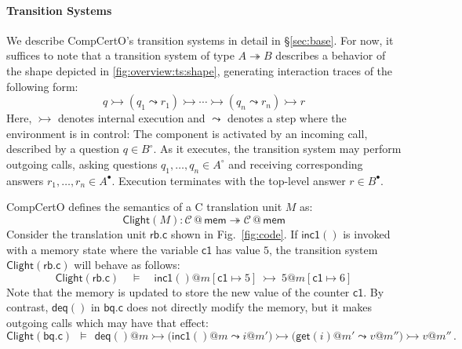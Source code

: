 \documentclass[acmsmall,screen,review,anonymous]{acmart}
\newcommand{\kw}[1]{\ensuremath{ \mathsf{#1} }}
\newcommand{\que}{\circ}
\newcommand{\ans}{\bullet}
\begin{document}
\paragraph{Transition Systems} %

We describe CompCertO's transition systems in detail in \S\ref{sec:base}.
For now, it suffices to note that
a transition system of type $A \twoheadrightarrow B$
describes a behavior of the shape depicted in \autoref{fig:overview:ts:shape},
generating interaction traces of the following form:
\[
  q \rightarrowtail (q_1 \leadsto r_1)
    \rightarrowtail \cdots \rightarrowtail (q_n \leadsto r_n)
    \rightarrowtail r
\]
Here, $\rightarrowtail$ denotes internal execution
and $\leadsto$ denotes a step where the environment is in control:
The component is activated by an incoming call,
described by a question $q \in B^\que$.
As it executes,
the transition system may perform outgoing calls,
asking questions
$q_1, \ldots, q_n \in A^\que$
and receiving corresponding answers
$r_1, \ldots, r_n \in A^\ans$.
Execution terminates with
the top-level answer $r \in B^\ans$.

\begin{example} \label{ex:overview:clightsem} %
CompCertO defines
the semantics of a C translation unit $M$
as:
\[
  \kw{Clight}(M) :
    \mathcal{C} \mathbin@ \kw{mem} \twoheadrightarrow
    \mathcal{C} \mathbin@ \kw{mem}
\]
%
Consider the translation unit $\kw{rb.c}$ shown in Fig.~\ref{fig:code}.
If $\kw{inc1}()$ is invoked
with a memory state where the variable $\kw{c1}$ has value $5$,
the transition system $\kw{Clight}(\kw{rb.c})$ will behave as follows:
\[
  \kw{Clight}(\kw{rb.c}) \quad \vDash \quad
  \kw{inc1}()@m[\kw{c1} \mapsto 5]
  \: \rightarrowtail \:
  5@m[\kw{c1} \mapsto 6]
\]
Note that the memory is updated to store the new value of the counter $\kw{c1}$.
By contrast, %
$\kw{deq}()$ in $\kw{bq.c}$
does not directly modify the memory,
but it makes outgoing calls which may have that effect:
\[
  \kw{Clight}(\kw{bq.c}) \:\: \vDash \:\:
  \kw{deq}()@m
  \rightarrowtail
  \big( \kw{inc1}()@m \leadsto i@m' \big)
  \rightarrowtail
  \big( \kw{get}(i)@m' \leadsto v@m'' \big)
  \rightarrowtail
  v@m''
  \,.
\]
\end{example}


\end{document}
